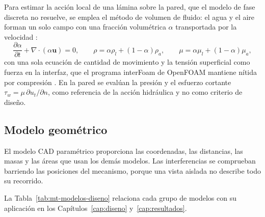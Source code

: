 Para estimar la acción local de una lámina sobre la pared, que el modelo de fase discreta no resuelve, se emplea el método de volumen de fluido: el agua y el aire forman un solo campo con una fracción volumétrica $\alpha$ transportada por la velocidad \cite{hirt1981}:
\begin{equation}
  \frac{\partial\alpha}{\partial t}+\nabla\cdot(\alpha\mathbf{u})=0,\qquad
  \rho=\alpha\rho_l+(1-\alpha)\rho_a,\qquad
  \mu=\alpha\mu_l+(1-\alpha)\mu_a,
  \label{eq:teo-vof}
\end{equation}
con una sola ecuación de cantidad de movimiento y la tensión superficial como fuerza en la interfaz, que el programa interFoam de OpenFOAM mantiene nítida por compresión \cite{deshpande2012}. En la pared se evalúan la presión y el esfuerzo cortante $\tau_w=\mu\,\partial u_t/\partial n$, como referencia de la acción hidráulica y no como criterio de diseño.

\subsection{Modelo geométrico}

El modelo CAD paramétrico proporciona las coordenadas, las distancias, las masas y las áreas que usan los demás modelos. Las interferencias se comprueban barriendo las posiciones del mecanismo, porque una vista aislada no describe todo su recorrido.

La Tabla~\ref{tab:mt-modelos-diseno} relaciona cada grupo de modelos con su aplicación en los Capítulos~\ref{cap:diseno} y~\ref{cap:resultados}.

